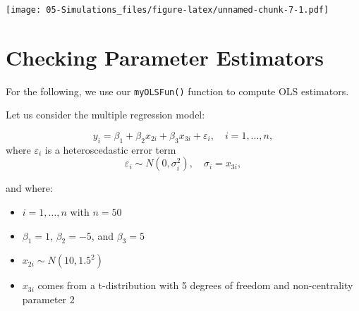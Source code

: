 \documentclass[]{book}
\newenvironment{Shaded}{\begin{snugshade}}{\end{snugshade}}
\newcommand{\CommentTok}[1]{\textcolor[rgb]{0.56,0.35,0.01}{\textit{#1}}}
\newcommand{\ControlFlowTok}[1]{\textcolor[rgb]{0.13,0.29,0.53}{\textbf{#1}}}
\newcommand{\DataTypeTok}[1]{\textcolor[rgb]{0.13,0.29,0.53}{#1}}
\newcommand{\DecValTok}[1]{\textcolor[rgb]{0.00,0.00,0.81}{#1}}
\newcommand{\KeywordTok}[1]{\textcolor[rgb]{0.13,0.29,0.53}{\textbf{#1}}}
\newcommand{\NormalTok}[1]{#1}
\newcommand{\OperatorTok}[1]{\textcolor[rgb]{0.81,0.36,0.00}{\textbf{#1}}}
\newcommand{\OtherTok}[1]{\textcolor[rgb]{0.56,0.35,0.01}{#1}}
\newcommand{\StringTok}[1]{\textcolor[rgb]{0.31,0.60,0.02}{#1}}
\providecommand{\tightlist}{%
  \setlength{\itemsep}{0pt}\setlength{\parskip}{0pt}}
\theoremstyle{definition}
\theoremstyle{definition}
\theoremstyle{definition}
\theoremstyle{remark}
\begin{document}
\texttt{[image: 05-Simulations\_files/figure-latex/unnamed-chunk-7-1.pdf]}

\hypertarget{checking-parameter-estimators}{%
\section{Checking Parameter Estimators}\label{checking-parameter-estimators}}

For the following, we use our \texttt{myOLSFun()} function to compute OLS estimators.

\begin{Shaded}
\end{Shaded}

Let us consider the multiple regression model:

\[y_i=\beta_1 +\beta_2 x_{2i}+\beta_3 x_{3i}+\varepsilon_{i},\quad i=1,\dots,n,\]
where \(\varepsilon_{i}\) is a heteroscedastic error term
\[\varepsilon_{i}\sim N(0,\sigma_i^2),\quad \sigma_i=x_{3i},\]

and where:

\begin{itemize}
\tightlist
\item
  \(i=1,\dots,n\) with \(n=50\)
\item
  \(\beta_1=1\), \(\beta_2=-5\), and \(\beta_3=5\)
\item
  \(x_{2i}\sim N(10,1.5^2)\)
\item
  \(x_{3i}\) comes from a t-distribution with 5 degrees of freedom and non-centrality parameter 2
\end{itemize}
\end{document}
